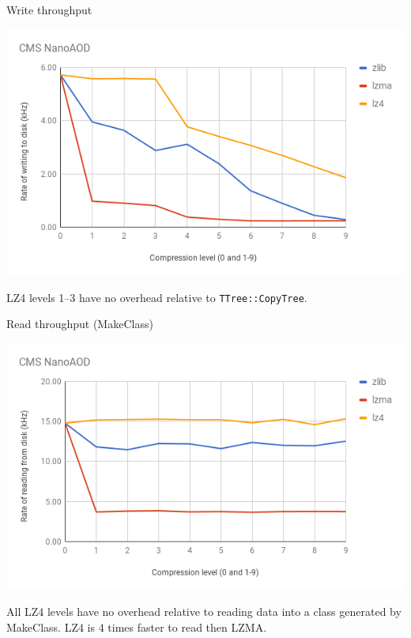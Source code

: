 \documentclass{beamer}
\begin{document}
\begin{frame}{Write throughput}
\begin{center}
\includegraphics[width=\linewidth]{write-vs-compression.png}
\end{center}

LZ4 levels 1--3 have no overhead relative to {\tt TTree::CopyTree}.
\vspace{\baselineskip}
\end{frame}

\begin{frame}{Read throughput (MakeClass)}
\begin{center}
\includegraphics[width=\linewidth]{read-vs-compression.png}
\end{center}

All LZ4 levels have no overhead relative to reading data into a class generated by MakeClass. LZ4 is 4 times faster to read then LZMA.
\end{frame}
\end{document}
